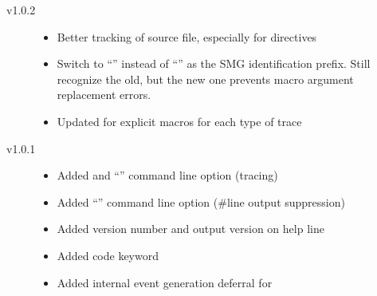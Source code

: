\begin{description}
\item[v1.0.2]
  \begin{itemize}
  \item Better tracking of source  file, especially for
     directives
  \item Switch to ``\code{_/}'' instead of ``\incode{_#}'' as the SMG
    identification prefix.  Still recognize the old, but the new one
    prevents macro argument replacement errors.
  \item Updated \SMTRACE for explicit macros for each type of trace
  \end{itemize}
  
\item[v1.0.1]
  \begin{itemize}
  \item Added \SMTRACE and ``'' command line option
    (tracing)
  \item Added ``'' command line option (\#line output
    suppression)
  \item Added version number and output version on help line
  \item Added  code keyword
  \item Added internal event generation deferral for
  \end{itemize}
  
\end{description}

